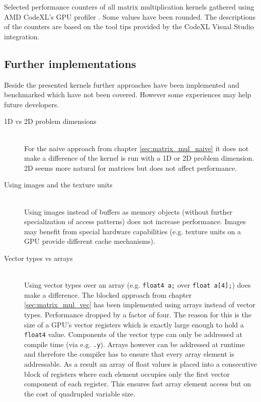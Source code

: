 \begin{table}
	\caption{Selected performance counters of all matrix multiplication kernels gathered using AMD CodeXL's GPU profiler \cite{amd_codexl}. Some values have been rounded. The descriptions of the counters are based on the tool tips provided by the CodeXL Visual Studio integration.}
	\label{tbl:matrix_perf_counter}
\end{table}

\subsection{Further implementations}
Beside the presented kernels further approaches have been implemented and benchmarked which have not been covered. However some experiences may help future developers.

\begin{description}
	\item[1D vs 2D problem dimensions] \hfill \\
	For the naive approach from chapter \ref{sec:matrix_mul_naive} it does not make a difference of the kernel is run with a 1D or 2D problem dimension. 2D seems more natural for matrices but does not affect performance.
	\item[Using images and the texture units] \hfill \\
	Using images instead of buffers as memory objects (without further specialization of access patterns) does not increase performance. Images may benefit from special hardware capabilities (e.g. texture units on a GPU provide different cache mechanisms).
	\item[Vector types vs arrays] \hfill \\
	Using vector types over an array (e.g. \lstinline!float4 a;! over \lstinline!float a[4];!) does make a difference. The blocked approach from chapter \ref{sec:matrix_mul_vec} has been implemented using arrays instead of vector types. Performance dropped by a factor of four. The reason for this is the size of a GPU's vector registers which is exactly large enough to hold a \lstinline!float4! value. Components of the vector type can only be addressed at compile time (via e.g. \lstinline!.y!). Arrays however can be addressed at runtime and therefore the compiler has to ensure that every array element is addressable. As a result an array of float values is placed into a consecutive block of registers where each element occupies only the first vector component of each register. This ensures fast array element access but on the cost of quadrupled variable size.
\end{description}

